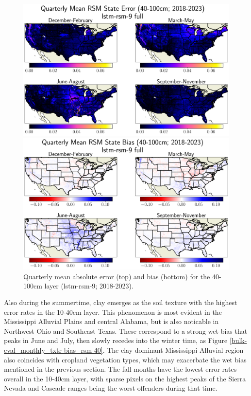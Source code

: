 \begin{figure}[hp!]
    \centering

    \includegraphics[width=.99\linewidth,draft=false]{figures/grid-eval_qtrly/eval-grid_full_lstm-rsm-9_pixelwise-time-stats_abs-err_qtrly-err-state-rsm-100.png}


    \includegraphics[width=.99\linewidth,draft=false]{figures/grid-eval_qtrly/eval-grid_full_lstm-rsm-9_pixelwise-time-stats_bias_qtrly-err-state-rsm-100.png}

    \caption{Quarterly mean absolute error (top) and bias (bottom) for the 40-100cm layer (lstm-rsm-9; 2018-2023).}
    \label{bulk-eval_qtrly_rsm-100}
\end{figure}


Also during the summertime, clay emerges as the soil texture with the highest error rates in the 10-40cm layer. This phenomenon is most evident in the Mississippi Alluvial Plains and central Alabama, but is also noticable in Northwest Ohio and Southeast Texas. These correspond to a strong wet bias that peaks in June and July, then slowly recedes into the winter time, as Figure \ref{bulk-eval_monthly_txtr-bias_rsm-40}. The clay-dominant Mississippi Alluvial region also coincides with cropland vegetation types, which may exacerbate the wet bias mentioned in the previous section. The fall months have the lowest error rates overall in the 10-40cm layer, with sparse pixels on the highest peaks of the Sierra Nevada and Cascade ranges being the worst offenders during that time.

